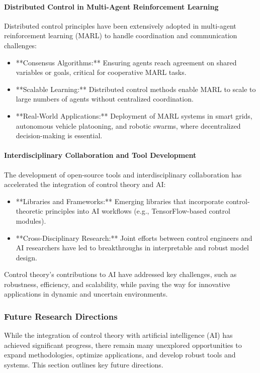 \documentclass{IEEEojcsys}
\begin{document}
\paragraph{Distributed Control in Multi-Agent Reinforcement Learning}
Distributed control principles have been extensively adopted in multi-agent reinforcement learning (MARL) to handle coordination and communication challenges:
\begin{itemize}
    \item **Consensus Algorithms:** Ensuring agents reach agreement on shared variables or goals, critical for cooperative MARL tasks.
    \item **Scalable Learning:** Distributed control methods enable MARL to scale to large numbers of agents without centralized coordination.
    \item **Real-World Applications:** Deployment of MARL systems in smart grids, autonomous vehicle platooning, and robotic swarms, where decentralized decision-making is essential.
\end{itemize}

\paragraph{Interdisciplinary Collaboration and Tool Development}
The development of open-source tools and interdisciplinary collaboration has accelerated the integration of control theory and AI:
\begin{itemize}
    \item **Libraries and Frameworks:** Emerging libraries that incorporate control-theoretic principles into AI workflows (e.g., TensorFlow-based control modules).
    \item **Cross-Disciplinary Research:** Joint efforts between control engineers and AI researchers have led to breakthroughs in interpretable and robust model design.
\end{itemize}

Control theory's contributions to AI have addressed key challenges, such as robustness, efficiency, and scalability, while paving the way for innovative applications in dynamic and uncertain environments.

\subsubsection{Future Research Directions}

While the integration of control theory with artificial intelligence (AI) has achieved significant progress, there remain many unexplored opportunities to expand methodologies, optimize applications, and develop robust tools and systems. This section outlines key future directions.
\end{document}
